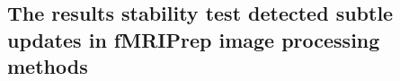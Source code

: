 \documentclass[lettersize,journal]{IEEEtran}
\newcommand{\TG}[1]{\color{orange}\textsc{From Tristan:} #1\color{black}\xspace}
\newcommand{\fmriprep}{fMRIPrep\xspace}
\begin{document}





\subsection{The results stability test detected subtle updates in \fmriprep image processing methods}
\end{document}
